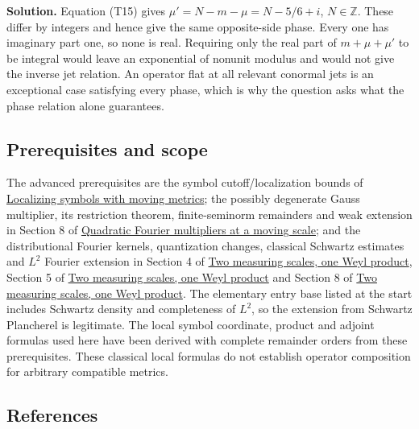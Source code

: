 \documentclass[
  11pt,
]{article}
\makeatletter
\let\ReaderOriginalAnchorStart\hyper@anchorstart
\let\ReaderOriginalAnchorEnd\hyper@anchorend
\let\ReaderPendingAliases\@empty
\def\ReaderArmAliases#1{\gdef\ReaderPendingAliases{#1}}
\def\hyper@anchorstart#1{\ReaderIfNativeAnchorTF{#1}{\ReaderPendingAliases\global\let\ReaderPendingAliases\@empty}{}\ReaderOriginalAnchorStart{#1}}
\makeatother
\begin{document}
\textbf{Solution.} Equation (T15) gives \(\mu'=N-m-\mu=N-5/6+i\),
\(N\in\mathbb Z\). These differ by integers and hence give the same
opposite-side phase. Every one has imaginary part one, so none is real.
Requiring only the real part of \(m+\mu+\mu'\) to be integral would
leave an exponential of nonunit modulus and would not give the inverse
jet relation. An operator flat at all relevant conormal jets is an
exceptional case satisfying every phase, which is why the question asks
what the phase relation alone guarantees.

\subsection{Prerequisites and scope}\label{prerequisites-and-scope}

The advanced prerequisites are the symbol cutoff/localization bounds of
\href{metric-localization.pdf}{Localizing symbols with moving metrics};
the possibly degenerate Gauss multiplier, its restriction theorem,
finite-seminorm remainders and weak extension in Section 8 of
\href{gauss-transform-estimates.pdf}{Quadratic Fourier multipliers at a
moving scale}; and the distributional Fourier kernels, quantization
changes, classical Schwartz estimates and \(L^2\) Fourier extension in
Section 4 of \href{weyl-metric-products.pdf}{Two measuring scales, one
Weyl product}, Section 5 of \href{weyl-metric-products.pdf}{Two measuring
scales, one Weyl product} and Section 8 of
\href{weyl-metric-products.pdf}{Two measuring scales, one Weyl product}.
The elementary entry base listed at the start includes Schwartz density
and completeness of \(L^2\), so the extension from Schwartz Plancherel
is legitimate. The local symbol coordinate, product and adjoint formulas
used here have been derived with complete remainder orders from these
prerequisites. These classical local formulas do not establish operator
composition for arbitrary compatible metrics.

\ReaderArmAliases{\ReaderOriginalAnchorStart{references-prerequisites-and-further-questions}\ReaderOriginalAnchorEnd\begingroup\expandafter\def\csname @currentHref\endcsname{references-prerequisites-and-further-questions}\label{references-prerequisites-and-further-questions}\endgroup\ReaderOriginalAnchorStart{references}\ReaderOriginalAnchorEnd}
\subsection{References}\label{references}
\end{document}
